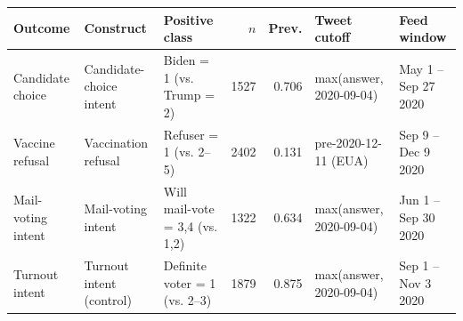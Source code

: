 \begin{tabular}{lllrrll}
\toprule
Outcome & Construct & Positive class & $n$ & Prev. & Tweet cutoff & Feed window \\
\midrule
Candidate choice & Candidate-choice intent & Biden = 1 (vs. Trump = 2) & 1527 & 0.706 & max(answer, 2020-09-04) & May 1 -- Sep 27 2020 \\
Vaccine refusal & Vaccination refusal & Refuser = 1 (vs. 2--5) & 2402 & 0.131 & pre-2020-12-11 (EUA) & Sep 9 -- Dec 9 2020 \\
Mail-voting intent & Mail-voting intent & Will mail-vote = {3,4} (vs. {1,2}) & 1322 & 0.634 & max(answer, 2020-09-04) & Jun 1 -- Sep 30 2020 \\
Turnout intent & Turnout intent (control) & Definite voter = 1 (vs. 2--3) & 1879 & 0.875 & max(answer, 2020-09-04) & Sep 1 -- Nov 3 2020 \\
\bottomrule
\end{tabular}